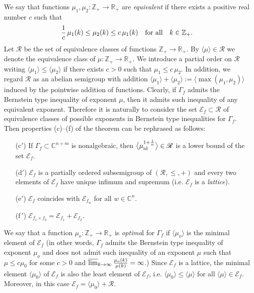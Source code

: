 \documentclass[11pt, oneside]{amsart}
\begin{document}
We say that functions $\mu_1,\mu_2:\mathbb Z_+\rightarrow\mathbb R_+$ are {\em equivalent} if there exists a positive real number $c$ such that
\[
\frac 1c \,\mu_1(k)\le \mu_2(k)\le c\,\mu_1(k)\quad {\rm for\ all}\quad k\in\mathbb Z_+.
\]
Let $\mathscr R$ be the set of equivalence classes of functions $\mathbb Z_+\rightarrow\mathbb R_+$. By $\langle\mu\rangle\in \mathscr R$ we denote the equivalence class of $\mu:\mathbb Z_+\rightarrow\mathbb R_+$. We introduce a partial order on $\mathscr R$ writing $\langle\mu_1\rangle\le\langle\mu_2\rangle$ if there exists $c>0$ such that $\mu_1\le c\,\mu_2$. In addition, we regard $\mathscr R$ as an abelian semigroup with addition $\langle\mu_1\rangle+\langle\mu_2\rangle:=\bigl\langle\max(\mu_1,\mu_2)\bigr\rangle$ induced by the pointwise addition of functions.
 Clearly, if $\Gamma_f$ admits the Bernstein type inequality of exponent $\mu$, then it admits such inequality of any equivalent exponent. Therefore it is naturally to consider the set $\mathscr E_f\subset\mathscr R$ of equivalence classes of possible exponents in Bernstein type inequalities for $\Gamma_f$. Then properties (c)--(f) of the theorem can be rephrased as follows:
\begin{itemize}
\item[(c$'$)] 
If $\Gamma_f\subset\mathbb C^{n+m}$ is nonalgebraic, then $\bigl\langle\mu_{{\rm id}}^{1+\frac 1n}\bigr\rangle\in \mathscr R$ is a lower bound of the set $\mathscr E_f$.
\item[(d$'$)] 
$\mathscr E_f$ is a partially ordered subsemigroup of $(\mathscr R,\le, +)$ and every two elements of $\mathscr E_f$ have unique infimum  and  supremum (i.e. $\mathscr E_f$ is a {\em lattice}).
\item[(e$'$)]
$\mathscr E_f$ coincides with $\mathscr E_{f_w}$ for all $w\in\mathbb C^n$.
\item[(f$\,'$)] 
$\mathscr E_{f_1\times f_2}=\mathscr E_{f_1}+\mathscr E_{f_2}$.
 \end{itemize}
 
We say that a function $\mu_o:\mathbb Z_+\rightarrow\mathbb R_+$ is {\em optima}l for $\Gamma_f$ if $\langle\mu_o\rangle$ is the minimal element of $\mathscr E_f$ (in other words,
$\Gamma_f$ admits the Bernstein type inequality of exponent $\mu_o$ and does not admit such inequality of an exponent $\mu$ such that $\mu\le c\mu_0$ for some $c>0$ and $ \varlimsup_{k\rightarrow\infty}\frac{\mu_o(k)}{\mu(k)}=\infty$.) Since $\mathscr E_f$ is a lattice, the minimal element $\langle\mu_0\rangle$ of $\mathscr E_f$ is   also the least element of $\mathscr E_f$, i.e. $\langle\mu_0\rangle\le\langle\mu\rangle$ for all $\langle\mu\rangle\in\mathscr E_f$. Moreover, in this case $\mathscr E_f=\langle\mu_0\rangle+\mathscr R$.
\end{document}
